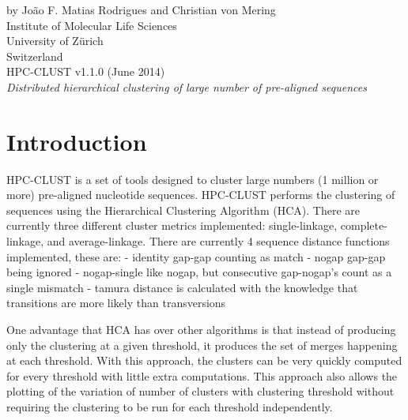 \documentclass[10pt,a4paper]{article}
\begin{document}
 

\pagestyle{empty} %

{
 \raggedleft %
 \vspace*{\baselineskip} %
 {\Large by Jo\~ao F. Matias Rodrigues and Christian von Mering\\
 Institute of Molecular Life Sciences\\University of Z\"urich\\Switzerland}\\[0.167\textheight] %
 {\Huge HPC-CLUST v1.1.0 (June 2014)}\\[\baselineskip] %
 {\Large \textit{Distributed hierarchical clustering of large number of pre-aligned sequences}}\par %
}
\vfill %
\vspace*{3\baselineskip} %

\newpage

\tableofcontents
\newpage
{}

\section{Introduction}

HPC-CLUST is a set of tools designed to cluster large numbers (1 million or more)
pre-aligned nucleotide sequences. HPC-CLUST performs the clustering of sequences
using the Hierarchical Clustering Algorithm (HCA). There are currently three different
cluster metrics implemented: single-linkage, complete-linkage, and average-linkage.
There are currently 4 sequence distance functions implemented, these are:
- identity
    gap-gap counting as match
- nogap
    gap-gap being ignored
- nogap-single
    like nogap, but consecutive gap-nogap's count as a single mismatch
- tamura
    distance is calculated with the knowledge that transitions are more likely than
   transversions

One advantage that HCA has over other algorithms is that instead of producing only the
clustering at a given threshold, it produces the set of merges happening at each threshold.
With this approach, the clusters can be very quickly computed for every threshold with
little extra computations. This approach also allows the plotting of the variation of
number of clusters with clustering threshold without requiring the clustering to be run
for each threshold independently.
\end{document}
